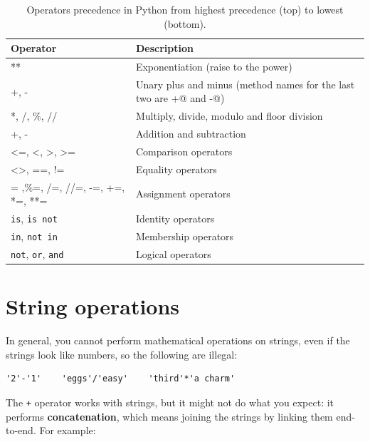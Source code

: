 \begin{table}[htb]
\begin{center}
\begin{tabular}{|p{3cm}|p{7cm}|}
\hline
Operator & Description\\\hline
** & Exponentiation (raise to the power)\\
+, - & Unary plus and minus (method names for the last two are +@ and -@)\\
*, /, \%, //  & Multiply, divide, modulo and floor division\\
+, - & Addition and subtraction\\
<=, <, >, >= & Comparison operators\\
<>, ==, != & Equality operators\\
= ,\%=, /=, //=, -=, +=, *=, **= & Assignment operators\\
\verb|is|, \verb|is not| & Identity operators\\
\verb|in|, \verb|not in| & Membership operators\\
\verb|not|, \verb|or|, \verb|and| & Logical operators\\\hline
\end{tabular}
\caption{Operators precedence in Python from highest precedence (top) to lowest (bottom).}
\label{tab:operator_precedence}
\end{center}
\end{table}

\section{String operations}

In general, you cannot perform mathematical operations on strings, even
if the strings look like numbers, so the following are illegal:

\beforeverb
\begin{verbatim}
'2'-'1'    'eggs'/'easy'    'third'*'a charm'
\end{verbatim}
\afterverb
%
The {\tt +} operator works with strings, but it
might not do what you expect: it performs
{\bf concatenation}, which means joining the strings by
linking them end-to-end.  For example:


